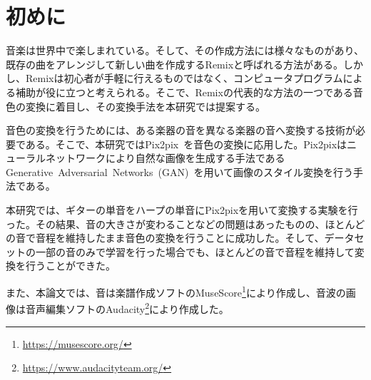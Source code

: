 \chapter{初めに}

音楽は世界中で楽しまれている。そして、その作成方法には様々なものがあり、既存の曲をアレンジして新しい曲を作成するRemixと呼ばれる方法がある。しかし、Remixは初心者が手軽に行えるものではなく、コンピュータプログラムによる補助が役に立つと考えられる。そこで、Remixの代表的な方法の一つである音色の変換に着目し、その変換手法を本研究では提案する。

音色の変換を行うためには、ある楽器の音を異なる楽器の音へ変換する技術が必要である。そこで、本研究ではPix2pix~\cite{pix2pix}を音色の変換に応用した。Pix2pixはニューラルネットワークにより自然な画像を生成する手法であるGenerative~Adversarial~Networks~(GAN)~\cite{GAN}を用いて画像のスタイル変換を行う手法である。

本研究では、ギターの単音をハープの単音にPix2pixを用いて変換する実験を行った。その結果、音の大きさが変わることなどの問題はあったものの、ほとんどの音で音程を維持したまま音色の変換を行うことに成功した。そして、データセットの一部の音のみで学習を行った場合でも、ほとんどの音で音程を維持して変換を行うことができた。

また、本論文では、音は楽譜作成ソフトのMuseScore\footnote{\url{https://musescore.org/}}により作成し、音波の画像は音声編集ソフトのAudacity\footnote{\url{https://www.audacityteam.org/}}により作成した。

\begin{comment}
既存研究の軽い紹介…。GAN,Pix2pix…。音楽の変換の研究(Hukebox,スペクトログラム,MIDI)…。この手法では…。音色の変換のみを扱うことで短期的な構造のみに着目できる点で他の音楽生成の研究よりも計算時間を削減できると期待される。
~\cite{Jukebox}
\end{comment}